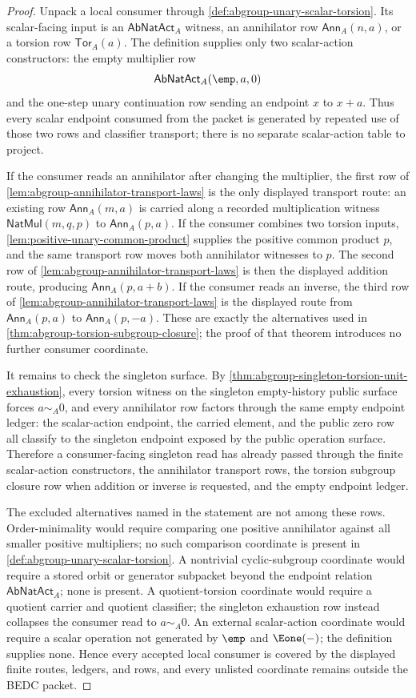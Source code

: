 \begin{proof}
Unpack a local consumer through \autoref{def:abgroup-unary-scalar-torsion}. Its scalar-facing input is an $\mathsf{AbNatAct}_A$ witness, an annihilator row $\mathsf{Ann}_A(n,a)$, or a torsion row $\mathsf{Tor}_A(a)$. The definition supplies only two scalar-action constructors: the empty multiplier row
$$
\mathsf{AbNatAct}_A(\emp,a,0)
$$
and the one-step unary continuation row sending an endpoint $x$ to $x+a$. Thus every scalar endpoint consumed from the packet is generated by repeated use of those two rows and classifier transport; there is no separate scalar-action table to project.

If the consumer reads an annihilator after changing the multiplier, the first row of \autoref{lem:abgroup-annihilator-transport-laws} is the only displayed transport route: an existing row $\mathsf{Ann}_A(m,a)$ is carried along a recorded multiplication witness $\mathsf{NatMul}(m,q,p)$ to $\mathsf{Ann}_A(p,a)$. If the consumer combines two torsion inputs, \autoref{lem:positive-unary-common-product} supplies the positive common product $p$, and the same transport row moves both annihilator witnesses to $p$. The second row of \autoref{lem:abgroup-annihilator-transport-laws} is then the displayed addition route, producing $\mathsf{Ann}_A(p,a+b)$. If the consumer reads an inverse, the third row of \autoref{lem:abgroup-annihilator-transport-laws} is the displayed route from $\mathsf{Ann}_A(p,a)$ to $\mathsf{Ann}_A(p,-a)$. These are exactly the alternatives used in \autoref{thm:abgroup-torsion-subgroup-closure}; the proof of that theorem introduces no further consumer coordinate.

It remains to check the singleton surface. By \autoref{thm:abgroup-singleton-torsion-unit-exhaustion}, every torsion witness on the singleton empty-history public surface forces $a\sim_A0$, and every annihilator row factors through the same empty endpoint ledger: the scalar-action endpoint, the carried element, and the public zero row all classify to the singleton endpoint exposed by the public operation surface. Therefore a consumer-facing singleton read has already passed through the finite scalar-action constructors, the annihilator transport rows, the torsion subgroup closure row when addition or inverse is requested, and the empty endpoint ledger.

The excluded alternatives named in the statement are not among these rows. Order-minimality would require comparing one positive annihilator against all smaller positive multipliers; no such comparison coordinate is present in \autoref{def:abgroup-unary-scalar-torsion}. A nontrivial cyclic-subgroup coordinate would require a stored orbit or generator subpacket beyond the endpoint relation $\mathsf{AbNatAct}_A$; none is present. A quotient-torsion coordinate would require a quotient carrier and quotient classifier; the singleton exhaustion row instead collapses the consumer read to $a\sim_A0$. An external scalar-action coordinate would require a scalar operation not generated by $\emp$ and $\Eone(-)$; the definition supplies none. Hence every accepted local consumer is covered by the displayed finite routes, ledgers, and rows, and every unlisted coordinate remains outside the BEDC packet.
\end{proof}
